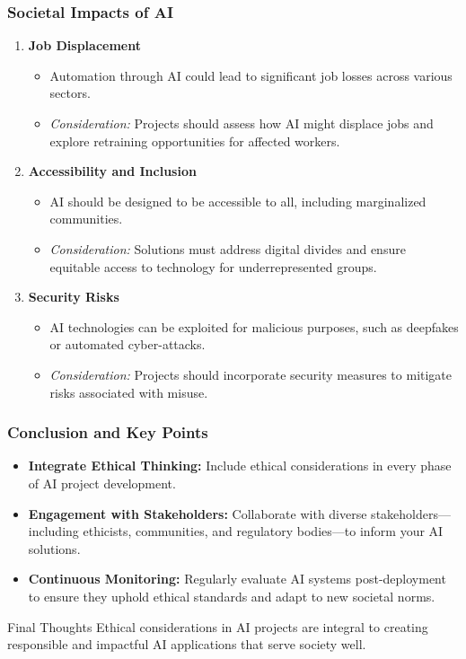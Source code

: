 \documentclass[aspectratio=169]{beamer}
\begin{document}
\begin{frame}[fragile]
    \frametitle{Societal Impacts of AI}
    \begin{enumerate}
        \item \textbf{Job Displacement}
            \begin{itemize}
                \item Automation through AI could lead to significant job losses across various sectors.
                \item \textit{Consideration:} Projects should assess how AI might displace jobs and explore retraining opportunities for affected workers.
            \end{itemize}
        \item \textbf{Accessibility and Inclusion}
            \begin{itemize}
                \item AI should be designed to be accessible to all, including marginalized communities.
                \item \textit{Consideration:} Solutions must address digital divides and ensure equitable access to technology for underrepresented groups.
            \end{itemize}
        \item \textbf{Security Risks}
            \begin{itemize}
                \item AI technologies can be exploited for malicious purposes, such as deepfakes or automated cyber-attacks.
                \item \textit{Consideration:} Projects should incorporate security measures to mitigate risks associated with misuse.
            \end{itemize}
    \end{enumerate}
\end{frame}

\begin{frame}[fragile]
    \frametitle{Conclusion and Key Points}
    \begin{itemize}
        \item \textbf{Integrate Ethical Thinking:} Include ethical considerations in every phase of AI project development.
        \item \textbf{Engagement with Stakeholders:} Collaborate with diverse stakeholders—including ethicists, communities, and regulatory bodies—to inform your AI solutions.
        \item \textbf{Continuous Monitoring:} Regularly evaluate AI systems post-deployment to ensure they uphold ethical standards and adapt to new societal norms.
    \end{itemize}
    
    \begin{block}{Final Thoughts}
        Ethical considerations in AI projects are integral to creating responsible and impactful AI applications that serve society well.
    \end{block}
\end{frame}
\end{document}
